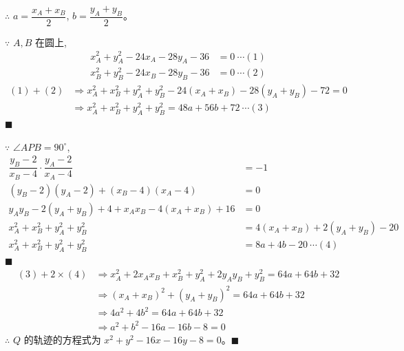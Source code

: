 \documentclass[10pt]{article}
\begin{document}
\begin{enumerate}
        $\therefore$ $a = \dfrac{x_{A}+x_{B}}{2}$, $b = \dfrac{y_{A}+y_{B}}{2}$。

        $\because$ $A, B$ 在圆上,
        \begin{align*}
          x_{A}^{2}+y_{A}^{2}-24 x_{A}-28 y_{A}-36 & = 0\ \cdots (1) \\
          x_{B}^{2}+y_{B}^{2}-24 x_{B}-28 y_{B}-36 & = 0\ \cdots (2)
        \end{align*}
        \begin{align*}
          (1) + (2) & \Rightarrow x_{A}^{2}+x_{B}^{2}+y_{A}^{2}+y_{B}^{2}-24(x_{A}+x_{B})-28(y_{A}+y_{B})-72 = 0 \\
                    & \Rightarrow x_{A}^{2}+x_{B}^{2}+y_{A}^{2}+y_{B}^{2} = 48a+56b+72\ \cdots (3)
        \end{align*} \hfill$\blacksquare$

        $\because$ $\angle APB=90^{\circ}$,
        \begin{align*}
          \dfrac{y_{B}-2}{x_{B}-4} \cdot \dfrac{y_{A}-2}{x_{A}-4}    & = -1                               \\
          (y_{B}-2)(y_{A}-2) + (x_{B}-4)(x_{A}-4)                    & = 0                                \\
          y_{A}y_{B}-2(y_{A}+y_{B})+4 + x_{A}x_{B}-4(x_{A}+x_{B})+16 & = 0                                \\
          x^{2}_{A}+x^{2}_{B}+y^{2}_{A}+y^{2}_{B}                    & = 4(x_{A}+x_{B})+2(y_{A}+y_{B})-20 \\
          x^{2}_{A}+x^{2}_{B}+y^{2}_{A}+y^{2}_{B}                    & = 8a+4b-20\ \cdots (4)
        \end{align*} \hfill$\blacksquare$
        \begin{align*}
          (3) + 2\times (4) & \Rightarrow x^{2}_{A}+2x_{A}x_{B}+x^{2}_{B}+y^{2}_{A}+2y_{A}y_{B}+y^{2}_{B} = 64a+64b+32 \\
                            & \Rightarrow (x_{A}+x_{B})^{2}+(y_{A}+y_{B})^{2} = 64a+64b+32                             \\
                            & \Rightarrow 4a^{2}+4b^{2} = 64a+64b+32                                                   \\
                            & \Rightarrow a^{2}+b^{2} - 16a-16b-8 = 0
        \end{align*}
        $\therefore$ $Q$ 的轨迹的方程式为 $x^2+y^2-16 x-16 y-8=0$。\hfill$\blacksquare$

\end{enumerate}
\end{document}
